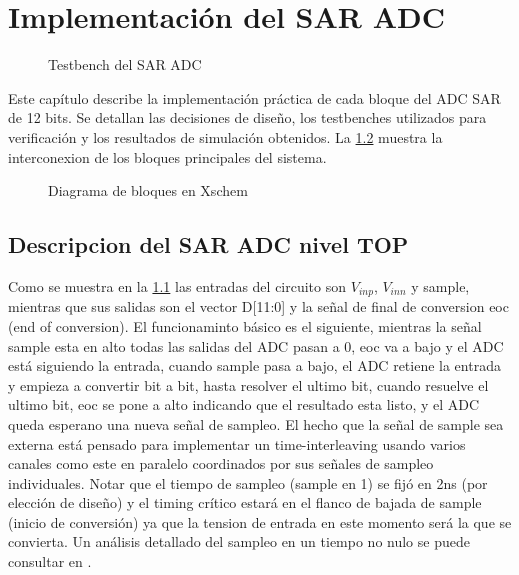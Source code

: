 \documentclass[12pt,a4paper]{report}
\begin{document}
\chapter{Implementación del SAR ADC}
\begin{figure}[H]
	\centering
	
	\caption{Testbench del SAR ADC}
	\label{toptb}
\end{figure}
Este capítulo describe la implementación práctica de cada bloque del ADC SAR de 12 bits. Se detallan las decisiones de diseño, los testbenches utilizados para verificación y los resultados de simulación obtenidos. La \cref{sar_xsc} muestra la interconexion de los bloques principales del sistema.
\begin{figure}[H]
    \centering
    
    \caption{Diagrama de bloques en Xschem}
    \label{sar_xsc}
\end{figure}
\section{Descripcion del SAR ADC nivel TOP}

Como se muestra en la \cref{toptb} las entradas del circuito son $V_{inp}$, $V_{inn}$ y sample, mientras que sus salidas son el vector D[11:0] y la señal de final de conversion eoc (end of conversion). El funcionaminto básico es el siguiente, mientras la señal sample esta en alto todas las salidas del ADC pasan a 0, eoc va a bajo y el ADC está siguiendo la entrada, cuando sample pasa a bajo, el ADC retiene la entrada y empieza a convertir bit a bit, hasta resolver el ultimo bit, cuando resuelve el ultimo bit, eoc se pone a alto indicando que el resultado esta listo, y el ADC queda esperano una nueva señal de sampleo. El hecho que la señal de sample sea externa está pensado para implementar un time-interleaving usando varios canales como este en paralelo coordinados por sus señales de sampleo individuales. Notar que el tiempo de sampleo (sample en 1) se fijó en 2ns (por elección de diseño) y el timing crítico estará en el flanco de bajada de sample (inicio de conversión) ya que la tension de entrada en  este momento será la que se convierta. Un análisis detallado del sampleo en un tiempo no nulo se puede consultar en \cite{iizuka_systematic}. 
\end{document}
